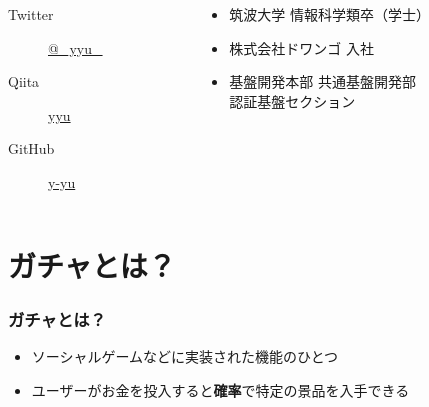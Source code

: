\begin{frame}
\begin{columns}
\begin{column}{0.4\textwidth}
      \begin{description}
        \item[Twitter] \href{https://twitter.com/\_yyu\_}{@\_yyu\_}
        \item[Qiita] \href{http://qiita.com/yyu}{yyu}
        \item[GitHub] \href{https://github.com/y-yu}{y-yu}
      \end{description}
    \end{column}
    \begin{column}{0.6\textwidth}
      \begin{itemize}
        \item<2-> 筑波大学 情報科学類卒（学士）
        \item<3-> 株式会社ドワンゴ 入社
        \item<4-> 基盤開発本部 共通基盤開発部 \\
          認証基盤セクション
      \end{itemize}
    \end{column}
  \end{columns}
\end{frame}

\section{ガチャとは？}

\begin{frame}
  \frametitle{ガチャとは？}

  \begin{itemize}
    \item<2-> ソーシャルゲームなどに実装された機能のひとつ
    \item<3-> ユーザーがお金を投入すると\textbf{確率}で特定の景品を入手できる
  \end{itemize}

  \begin{center}


  \end{center}
\end{frame}

